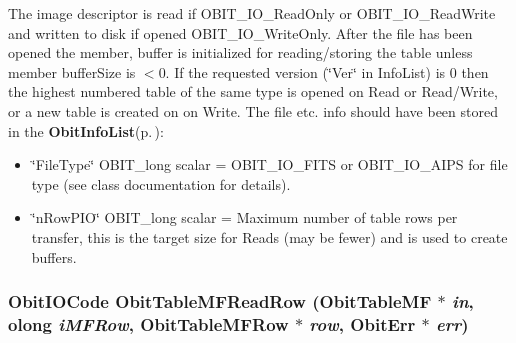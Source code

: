 The image descriptor is read if OBIT\_\-IO\_\-Read\-Only or OBIT\_\-IO\_\-Read\-Write and written to disk if opened OBIT\_\-IO\_\-Write\-Only. After the file has been opened the member, buffer is initialized for reading/storing the table unless member buffer\-Size is $<$0. If the requested version (\char`\"{}Ver\char`\"{} in Info\-List) is 0 then the highest numbered table of the same type is opened on Read or Read/Write, or a new table is created on on Write. The file etc. info should have been stored in the {\bf Obit\-Info\-List}{\rm (p.\,\pageref{structObitInfoList})}: \begin{itemize}
\item \char`\"{}File\-Type\char`\"{} OBIT\_\-long scalar = OBIT\_\-IO\_\-FITS or OBIT\_\-IO\_\-AIPS for file type (see class documentation for details). \item \char`\"{}n\-Row\-PIO\char`\"{} OBIT\_\-long scalar = Maximum number of table rows per transfer, this is the target size for Reads (may be fewer) and is used to create buffers. 
\end{itemize}
\subsubsection{\setlength{\rightskip}{0pt plus 5cm}Obit\-IOCode Obit\-Table\-MFRead\-Row ({\bf Obit\-Table\-MF} $\ast$ {\em in}, {\bf olong} {\em i\-MFRow}, {\bf Obit\-Table\-MFRow} $\ast$ {\em row}, {\bf Obit\-Err} $\ast$ {\em err})}\label{ObitTableMF_8h_a18}


